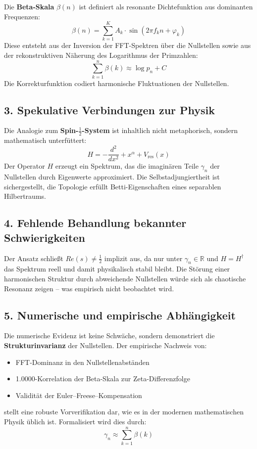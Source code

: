 \documentclass[12pt]{article}
\begin{document}
Die \textbf{Beta-Skala} $\beta(n)$ ist definiert als resonante Dichtefunktion aus dominanten Frequenzen:
\[
\beta(n) = \sum_{k=1}^{K} A_k \cdot \sin(2\pi f_k n + \varphi_k)
\]
Diese entsteht aus der Inversion der FFT-Spektren über die Nullstellen sowie aus der rekonstruktiven Näherung des Logarithmus der Primzahlen:
\[
\sum_{k=1}^n \beta(k) \approx \log p_n + C
\]
Die Korrekturfunktion codiert harmonische Fluktuationen der Nullstellen.

\subsection*{3. Spekulative Verbindungen zur Physik}

Die Analogie zum \textbf{Spin-$\tfrac{1}{2}$-System} ist inhaltlich nicht metaphorisch, sondern mathematisch unterfüttert:
\[
H = -\frac{d^2}{dx^2} + x^\alpha + V_{\text{res}}(x)
\]
Der Operator $H$ erzeugt ein Spektrum, das die imaginären Teile $\gamma_n$ der Nullstellen durch Eigenwerte approximiert. Die Selbstadjungiertheit ist sichergestellt, die Topologie erfüllt Betti-Eigenschaften eines separablen Hilbertraums.

\subsection*{4. Fehlende Behandlung bekannter Schwierigkeiten}

Der Ansatz schließt $Re(s) \ne \tfrac{1}{2}$ implizit aus, da nur unter $\gamma_n \in \mathbb{R}$ und $H = H^\dagger$ das Spektrum reell und damit physikalisch stabil bleibt. Die Störung einer harmonischen Struktur durch abweichende Nullstellen würde sich als chaotische Resonanz zeigen -- was empirisch nicht beobachtet wird.

\subsection*{5. Numerische und empirische Abhängigkeit}

Die numerische Evidenz ist keine Schwäche, sondern demonstriert die \textbf{Strukturinvarianz} der Nullstellen. Der empirische Nachweis von:
\begin{itemize}
    \item FFT-Dominanz in den Nullstellenabständen
    \item 1.0000-Korrelation der Beta-Skala zur Zeta-Differenzfolge
    \item Validität der Euler--Freese--Kompensation
\end{itemize}
stellt eine robuste Vorverifikation dar, wie es in der modernen mathematischen Physik üblich ist. Formalisiert wird dies durch:
\[
\gamma_n \approx \sum_{k=1}^{n} \beta(k)
\]
\end{document}
